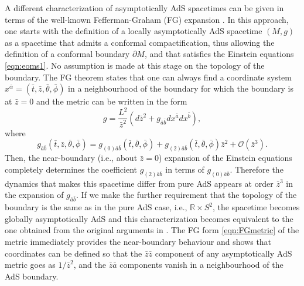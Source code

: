 \documentclass[aps,letterpaper,twocolumn,nofootinbib]{revtex4}
\numberwithin{equation}{section}
\begin{document}
A different characterization of asymptotically AdS spacetimes can be given in terms of the well-known Fefferman-Graham (FG) expansion \cite{AST_1985__S131__95_0}.
In this approach, one starts with the definition of a locally asymptotically AdS spacetime $(M,g)$ as a spacetime that admits a conformal compactification, thus allowing the definition of a conformal boundary $\partial M$, and that satisfies the Einstein equations \eqref{eqn:eoms1}. No assumption is made at this stage on the topology of the boundary.
The FG theorem states that one can always find a coordinate system $x^{\bar{\alpha}}=(\bar{t},\bar{z},\bar{\theta},\bar{\phi})$ in a neighbourhood of the boundary for which the boundary is at $\bar{z}=0$ and the metric can be written in the form
\begin{equation}
\label{eqn:FGmetric}
g=\frac{L^2}{\bar{z}^2}(d\bar{z}^2+g_{\bar{a}\bar{b}}dx^{\bar{a}}dx^{\bar{b}}),
\end{equation}
where 
\begin{equation}
\label{eqn:FGbdymetric}
g_{\bar{a}\bar{b}}(\bar{t},\bar{z},\bar{\theta},\bar{\phi})=g_{(0)\bar{a}\bar{b}}(\bar{t},\bar{\theta},\bar{\phi})+g_{(2)\bar{a}\bar{b}}(\bar{t},\bar{\theta},\bar{\phi})\bar{z}^2+\mathcal{O}(\bar{z}^3).
\end{equation}
Then, the near-boundary (i.e., about $\bar{z}=0$) expansion of the Einstein equations completely determines the coefficient $g_{(2)\bar{a}\bar{b}}$ in terms of $g_{(0)\bar{a}\bar{b}}$.
Therefore the dynamics that makes this spacetime differ from pure AdS appears at order $\bar{z}^3$ in the expansion of $g_{\bar{a}\bar{b}}$. If we make the further requirement that the topology of the boundary is the same as in the pure AdS case, i.e., $\mathbb{R}\times S^2$, the spacetime becomes globally asymptotically AdS and this characterization becomes equivalent to the one obtained from the original arguments in \cite{Henneaux:1985tv}. 
The FG form \eqref{eqn:FGmetric} of the metric immediately provides the near-boundary behaviour and shows that coordinates can be defined so that the $\bar{z}\bar{z}$ component of any asymptotically AdS metric goes as $1/\bar{z}^2$, and the $\bar{z}\bar{a}$ components vanish in a neighbourhood of the AdS boundary.
\end{document}
